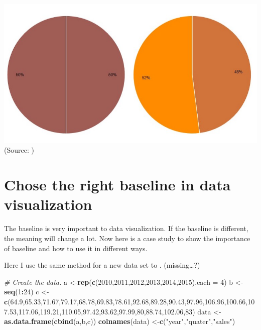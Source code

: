 \documentclass[]{book}
\newenvironment{Shaded}{\begin{snugshade}}{\end{snugshade}}
\newcommand{\KeywordTok}[1]{\textcolor[rgb]{0.13,0.29,0.53}{\textbf{#1}}}
\newcommand{\DataTypeTok}[1]{\textcolor[rgb]{0.13,0.29,0.53}{#1}}
\newcommand{\DecValTok}[1]{\textcolor[rgb]{0.00,0.00,0.81}{#1}}
\newcommand{\FloatTok}[1]{\textcolor[rgb]{0.00,0.00,0.81}{#1}}
\newcommand{\StringTok}[1]{\textcolor[rgb]{0.31,0.60,0.02}{#1}}
\newcommand{\CommentTok}[1]{\textcolor[rgb]{0.56,0.35,0.01}{\textit{#1}}}
\newcommand{\OperatorTok}[1]{\textcolor[rgb]{0.81,0.36,0.00}{\textbf{#1}}}
\newcommand{\NormalTok}[1]{#1}
\theoremstyle{definition}
\theoremstyle{definition}
\theoremstyle{definition}
\theoremstyle{remark}
\begin{document}
\includegraphics{images/henry-half.png} (Source:
\citep{henry-defense-pie})

\section{Chose the right baseline in data
visualization}\label{chose-the-right-baseline-in-data-visualization}

The baseline is very important to data visualization. If the baseline is
different, the meaning will change a lot. Now here is a case study to
show the importance of baseline and how to use it in different ways.

Here I use the same method for a new data set to . (missing\ldots{}?)

\begin{Shaded}
\begin{Highlighting}[]
\CommentTok{# Create the data.}
\NormalTok{a <-}\KeywordTok{rep}\NormalTok{(}\KeywordTok{c}\NormalTok{(}\DecValTok{2010}\NormalTok{,}\DecValTok{2011}\NormalTok{,}\DecValTok{2012}\NormalTok{,}\DecValTok{2013}\NormalTok{,}\DecValTok{2014}\NormalTok{,}\DecValTok{2015}\NormalTok{),}\DataTypeTok{each =} \DecValTok{4}\NormalTok{)}
\NormalTok{b <-}\StringTok{ }\KeywordTok{seq}\NormalTok{(}\DecValTok{1}\OperatorTok{:}\DecValTok{24}\NormalTok{)}
\NormalTok{c <-}\StringTok{ }\KeywordTok{c}\NormalTok{(}\FloatTok{64.9}\NormalTok{,}\FloatTok{65.33}\NormalTok{,}\FloatTok{71.67}\NormalTok{,}\FloatTok{79.17}\NormalTok{,}\FloatTok{68.78}\NormalTok{,}\FloatTok{69.83}\NormalTok{,}\FloatTok{78.61}\NormalTok{,}\FloatTok{92.68}\NormalTok{,}\FloatTok{89.28}\NormalTok{,}\FloatTok{90.43}\NormalTok{,}\FloatTok{97.96}\NormalTok{,}\FloatTok{106.96}\NormalTok{,}\FloatTok{100.66}\NormalTok{,}\FloatTok{107.53}\NormalTok{,}\FloatTok{117.06}\NormalTok{,}\FloatTok{119.21}\NormalTok{,}\FloatTok{110.05}\NormalTok{,}\FloatTok{97.42}\NormalTok{,}\FloatTok{93.62}\NormalTok{,}\FloatTok{97.99}\NormalTok{,}\DecValTok{80}\NormalTok{,}\FloatTok{88.74}\NormalTok{,}\FloatTok{102.06}\NormalTok{,}\DecValTok{83}\NormalTok{)}
\NormalTok{data <-}\StringTok{ }\KeywordTok{as.data.frame}\NormalTok{(}\KeywordTok{cbind}\NormalTok{(a,b,c))}
\KeywordTok{colnames}\NormalTok{(data) <-}\KeywordTok{c}\NormalTok{(}\StringTok{"year"}\NormalTok{,}\StringTok{"quater"}\NormalTok{,}\StringTok{"sales"}\NormalTok{)}
\end{Highlighting}
\end{Shaded}
\end{document}
